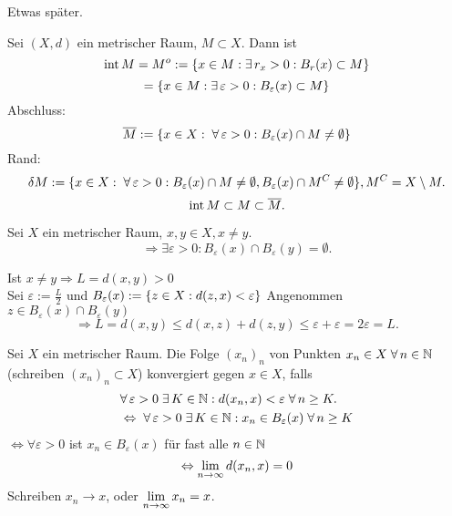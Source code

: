 \documentclass[../ana2.tex]{subfiles}
\begin{document}
\begin{bew}
    Etwas später.
\end{bew}
\begin{defi}
    Sei \( (X, d) \) ein metrischer Raum, \( M \subset X \).
    Dann ist 
    \[ \inner M = M^o 
    := \set{x \in M: \exists r_x > 0: B_r(x)\subset M}\]
    \[= \set{x \in M: \exists \varepsilon > 0: 
    B_\varepsilon(x) \subset M }\]
    Abschluss:
    \[ \overline{M} := 
    \set{x \in X: \; \forall \varepsilon > 0: 
    B_\varepsilon(x) \cap M \neq \emptyset} \]
    Rand: 
    \[ \delta M := \set{ x \in X: \; \forall \varepsilon > 0: 
    B_\varepsilon(x) \cap M \neq \emptyset, 
    B_\varepsilon(x) \cap M^C \neq \emptyset },
    M^C = X \setminus M. \]
    \[ \operatorname{int} M \subset M \subset \overline{M}. \]
\end{defi}
\begin{lem}
    Sei \( X \) ein metrischer Raum, 
    \( x,y \in X, x\neq y \). 
    \[ \Rightarrow \exists \varepsilon > 0: 
    B_\varepsilon(x) \cap B_\varepsilon(y) = \emptyset. \]
\end{lem}
\begin{bew}
    Ist \(x \neq y \Rightarrow L = d(x,y) > 0 \) \\
    Sei \( \varepsilon := \frac{L}{2} \) und 
    \( B_\varepsilon(x) := \{z \in X: d(z,x) < \varepsilon\} \)
    Angenommen \( z \in B_\varepsilon(x) \cap 
    B_\varepsilon(y) \)
    \[ \Rightarrow L = d(x,y) 
    \leq d(x,z) + d(z,y) 
    \leq \varepsilon + \varepsilon = 2\varepsilon = L. \]
\end{bew}
\begin{defi}[Konvergenz]
    Sei \( X \) ein metrischer Raum. Die Folge 
    \( (x_n)_n \) von Punkten \( x_n \in X \; \forall n\in\N \)
    (schreiben \( (x_n)_n \subset X \)) konvergiert 
    gegen \( x \in X \), falls 
    \begin{align*}
        &\forall \varepsilon > 0 \; \exists K \in \N: 
        d(x_n, x) < \varepsilon \;\forall n \geq K. \\
        &\Leftrightarrow \; \forall \varepsilon > 0 
        \; \exists K \in \N: x_n \in B_\varepsilon(x) 
        \; \forall n \geq K 
    \end{align*}
    \( \Leftrightarrow \forall \varepsilon > 0  \) 
    ist \( x_n \in B_\varepsilon(x) \) für fast alle 
    \( n\in\mathbb{N} \)
    \[ \Leftrightarrow \lim\limits_{n\rightarrow\infty} d(x_n, x) = 0 \]
    Schreiben \( x_n \rightarrow x \), oder 
    \( \lim\limits_{n\rightarrow\infty} x_n = x \).
\end{defi}
\end{document}
